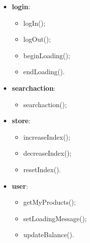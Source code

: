 \begin{itemize}
\begin{itemize}
	\end{itemize}
	\item \textbf{login}:
	\begin{itemize}
		\item logIn();
		\item logOut();
		\item beginLoading();
		\item endLoading().
	\end{itemize}
	\item \textbf{searchaction}:
	\begin{itemize}
		\item searchaction();
	\end{itemize}
	\item \textbf{store}:
	\begin{itemize}
		\item increaseIndex();
		\item decreaseIndex();
		\item resetIndex().
	\end{itemize}
	\item \textbf{user}:
	\begin{itemize}
		\item getMyProducts();
		\item setLoadingMessage();
		\item updateBalance().
	\end{itemize}
\end{itemize}

